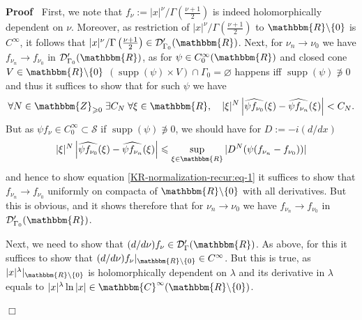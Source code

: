\documentclass{article}
\newcommand{\assign}{:=}
\newcommand{\nni}{\not\ni}
\newcommand{\tmop}[1]{\ensuremath{\operatorname{#1}}}
\newenvironment{proof}{\noindent\textbf{Proof\ }}{\hspace*{\fill}$\Box$\medskip}
\numberwithin{definition}{section}
\numberwithin{lemma}{section}
\numberwithin{proposition}{section}
{\theorembodyfont{\rmfamily}\newtheorem{remark}{Remark}
\numberwithin{remark}{section}
}
\begin{document}
\begin{proof}
  First, we note that $f_{\nu} \assign | x |^{\nu} / \Gamma \left( \frac{\nu +
  1}{2} \right)$ is indeed holomorphically dependent on $\nu$. Moreover, as
  restriction of $| x |^{\nu} / \Gamma \left( \frac{\nu + 1}{2} \right)$ to
  $\mathbbm{R}\backslash \{ 0 \}$ is $C^{\infty}$, it follows that $| x
  |^{\nu} / \Gamma \left( \frac{\nu + 1}{2} \right) \in
  \mathcal{D}'_{\Gamma_0} ( \mathbbm{R})$. Next, for $\nu_n \rightarrow \nu_0$
  we have $f_{\nu_n} \rightarrow f_{\nu_0}$ in $\mathcal{D}'_{\Gamma_0} (
  \mathbbm{R})$, as for $\psi \in C^{\infty}_0 ( \mathbbm{R})$ and closed cone
  $V \in \mathbbm{R}\backslash \{ 0 \}$ $( \tmop{supp} ( \psi) \times V) \cap
  \Gamma_0 = \varnothing$ happens iff $\tmop{supp} ( \psi) \nni 0$ and thus it
  suffices to show that for such $\psi$ we have
  \begin{equation}
    \forall N \in \mathbbm{Z}_{\geqslant 0} \; \exists C_N \; \forall \xi \in
    \mathbbm{R}, \hspace{1em} | \xi |^N \left| \widehat{\psi f_{\nu_0}} ( \xi)
    - \widehat{\psi f_{\nu_n}} ( \xi) \right| < C_N .
    \label{KR-normalization-recur:eq-1}
  \end{equation}
  But as $\psi f_{\nu} \in C^{\infty}_0 \subset \mathcal{S}$ if $\tmop{supp} (
  \psi) \nni 0$, we should have for $D \assign - i ( d / d x)$
  \[ | \xi |^N \left| \widehat{\psi f_{\nu_0}} ( \xi) - \widehat{\psi
     f_{\nu_n}} ( \xi) \right| \leqslant \sup_{\xi \in \mathbbm{R}} | D^N (
     \psi ( f_{\nu_n} - f_{\nu_0})) | \]
  and hence to show equation \ref{KR-normalization-recur:eq-1} it suffices to
  show that $f_{\nu_n} \rightarrow f_{\nu_0}$ uniformly on compacta of
  $\mathbbm{R}\backslash \{ 0 \}$ with all derivatives. But this is obvious,
  and it shows therefore that for $\nu_n \rightarrow \nu_0$ we have $f_{\nu_n}
  \rightarrow f_{\nu_0}$ in $\mathcal{D}'_{\Gamma_0} ( \mathbbm{R})$.
  
  Next, we need to show that $( d / d \nu) f_{\nu} \in \mathcal{D}'_{\Gamma} (
  \mathbbm{R})$. As above, for this it suffices to show that $( d / d \nu)
  f_{\nu} |_{\mathbbm{R}\backslash \{ 0 \}} \in C^{\infty}$. But this is true,
  as $| x |^{\lambda} |_{\mathbbm{R}\backslash \{ 0 \}}$ is holomorphically
  dependent on $\lambda$ and its derivative in $\lambda$ equals to $| x
  |^{\lambda} \ln | x | \in \mathbbm{C}^{\infty} ( \mathbbm{R}\backslash \{ 0
  \})$.
  

\end{proof}
\end{document}
